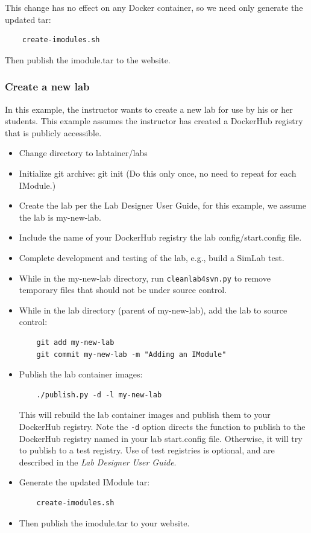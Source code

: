 \documentclass[12pt]{article}
\begin{document}
This change has no effect on any Docker container, so we need only generate the 
updated tar:
\begin{verbatim}
    create-imodules.sh
\end{verbatim}

\noindent Then publish the imodule.tar to the website.

\subsubsection{Create a new lab}
In this example, the instructor wants to create a new lab for use by his or her students.
This example assumes the instructor has created a DockerHub registry that is publicly accessible.
\begin{itemize}
\item Change directory to labtainer/labs
\item Initialize git archive: git init  (Do this only once, no need to repeat for each IModule.)  
\item Create the lab per the Lab Designer User Guide, for this example, we assume the lab is my-new-lab.
\item Include the name of your DockerHub registry the lab config/start.config file.
\item Complete development and testing of the lab, e.g., build a SimLab test.
\item While in the my-new-lab directory, run {\tt cleanlab4svn.py} to remove temporary files that should not be under source control.
\item While in the lab directory (parent of my-new-lab), add the lab to source control:
\begin{verbatim}
    git add my-new-lab
    git commit my-new-lab -m "Adding an IModule"
\end{verbatim}
\item Publish the lab container images: 
\begin{verbatim}
    ./publish.py -d -l my-new-lab
\end{verbatim}
\noindent This will rebuild the lab container images and publish them to your DockerHub registry.  Note the {\tt -d} option directs the 
function to publish to the DockerHub registry named in your lab start.config file.  Otherwise, it will try to publish to a test registry.
Use of test registries is optional, and are described in the \textit{Lab Designer User Guide}.
\item Generate the updated IModule tar:
\begin{verbatim}
    create-imodules.sh
\end{verbatim}
\item Then publish the imodule.tar to your website.
\end{itemize}
\end{document}
